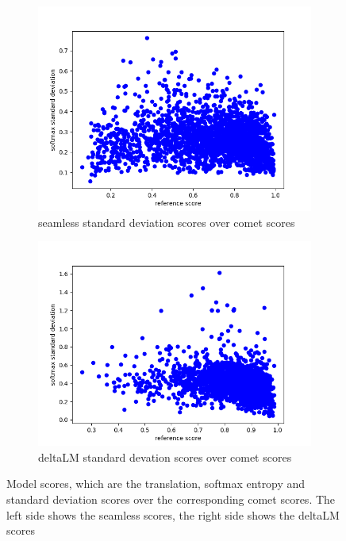 \begin{figure}[ht]
\begin{subfigure}{0.4\linewidth}
        \includegraphics[width=\textwidth]{Latex/sections/images/seamlessstddiv.png}
        \caption{seamless standard deviation scores over comet scores}
    \end{subfigure}
    \begin{subfigure}{0.4\linewidth}
        \includegraphics[width=\textwidth]{Latex/sections/images/dlmstddiv.png}
        \caption{deltaLM standard devation scores over comet scores}
    \end{subfigure}
    \caption{Model scores, which are the translation, softmax entropy and standard deviation scores over the corresponding comet scores. The left side shows the seamless scores, the right side shows the deltaLM scores}
    \label{fig:translationeval scatter plot}
\end{figure}


